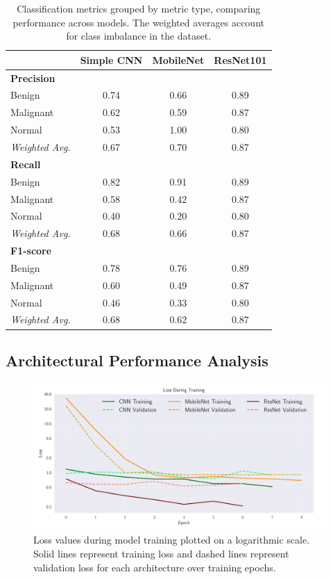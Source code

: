 \begin{table}[h!]
    \centering
    \begin{tabular}{lccc}
        \hline
        & Simple CNN & MobileNet & ResNet101 \\
        \hline
        \multicolumn{4}{l}{\textbf{Precision}} \\
        Benign & 0.74 & 0.66 & 0.89 \\
        Malignant & 0.62 & 0.59 & 0.87 \\
        Normal & 0.53 & 1.00 & 0.80 \\
        \textit{Weighted Avg.} & 0.67 & 0.70 & 0.87 \\
        \hline
        \multicolumn{4}{l}{\textbf{Recall}} \\
        Benign & 0.82 & 0.91 & 0.89 \\
        Malignant & 0.58 & 0.42 & 0.87 \\
        Normal & 0.40 & 0.20 & 0.80 \\
        \textit{Weighted Avg.} & 0.68 & 0.66 & 0.87 \\
        \hline
        \multicolumn{4}{l}{\textbf{F1-score}} \\
        Benign & 0.78 & 0.76 & 0.89 \\
        Malignant & 0.60 & 0.49 & 0.87 \\
        Normal & 0.46 & 0.33 & 0.80 \\
        \textit{Weighted Avg.} & 0.68 & 0.62 & 0.87 \\
        \hline
    \end{tabular}
    \caption{Classification metrics grouped by metric type, comparing performance across models. The weighted averages account for class imbalance in the dataset.}
    \label{tab:classification_metrics}
\end{table}

\onecolumngrid
\subsection{Architectural Performance Analysis }

\begin{figure}[h!]
    \begin{minipage}{\textwidth}
        \centering
        \includegraphics[width = .9\textwidth]{../figs/cnn_loss.pdf}
        \caption{Loss values during model training plotted on a logarithmic scale. Solid lines represent training loss and dashed lines represent validation loss for each architecture over training epochs.}
        \label{fig:loss_curves}
    \end{minipage}
\end{figure}

